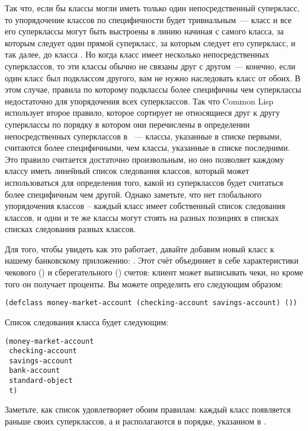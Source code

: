 Так что, если бы классы могли иметь только один непосредственный суперкласс, то
упорядочение классов по специфичности будет тривиальным~--- класс и все его суперклассы
могут быть выстроены в линию начиная с самого класса, за которым следует один прямой
суперкласс, за которым следует его суперкласс, и так далее, до класса .  Но когда
класс имеет несколько непосредственных суперклассов, то эти классы обычно не связаны друг
с другом~--- конечно, если один класс был подклассом другого, вам не нужно наследовать
класс от обоих.  В этом случае, правила по которому подклассы более специфичны чем
суперклассы недостаточно для упорядочения всех суперклассов.  Так что Common Lisp
использует второе правило, которое сортирует не относящиеся друг к другу суперклассы по
порядку в котором они перечислены в определении непосредственных суперклассов в
~--- классы, указанные в списке первыми, считаются более специфичными, чем
классы, указанные в списке последними.  Это правило считается достаточно произвольным, но
оно позволяет каждому классу иметь линейный список следования классов, который может
использоваться для определения того, какой из суперклассов будет считаться более
специфичным чем другой.  Однако заметьте, что нет глобального упорядочения классов --
каждый класс имеет собственный список следования классов, и одни и те же классы могут
стоять на разных позициях в списках списках следования разных классов.

Для того, чтобы увидеть как это работает, давайте добавим новый класс к нашему банковскому
приложению: .  Этот счёт объединяет в себе характеристики
чекового () и сберегательного () счетов:
клиент может выписывать чеки, но кроме того он получает проценты.  Вы можете определить
его следующим образом:

\begin{lstlisting}
(defclass money-market-account (checking-account savings-account) ())
\end{lstlisting}

Список следования класса  будет следующим:

\begin{lstlisting}
(money-market-account
 checking-account
 savings-account
 bank-account
 standard-object
 t)
\end{lstlisting}

Заметьте, как список удовлетворяет обоим правилам: каждый класс появляется раньше своих
суперклассов, а  и  располагаются в порядке,
указанном в .

